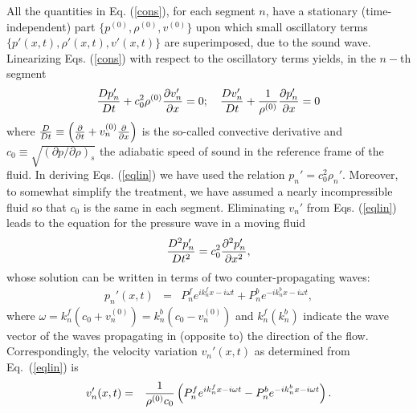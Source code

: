 \documentclass[aps,prl,twocolumn,groupedaddress,amsmath,amssymb]{revtex4}
\begin{document}
All the quantities in Eq. (\ref{cons}), for each segment $n$, have a stationary (time-independent) part $\{p^{(0)},\rho^{(0)}, v^{(0)}\}$ upon which
small oscillatory terms $\{p'(x,t),\rho'(x,t), v'(x,t)\}$ are superimposed, due to the sound wave. Linearizing Eqs. (\ref{cons}) with respect to the
oscillatory terms yields, in the $n-$th segment
\begin{equation}
\label{eqlin}
{Dp_n'\over Dt} +c_0^2\rho^{(0)} {\partial v_n'\over \partial x}=0;\quad {Dv_n'\over Dt} +{1\over \rho^{(0)}} {\partial p_n'\over \partial x}=0
\end{equation}
where ${D\over Dt} \equiv \left({\partial \over \partial t} + v_n^{(0)} {\partial \over \partial x}\right)$ is the so-called convective derivative and
$c_0\equiv \sqrt{(\partial p/\partial \rho)_s}$ the adiabatic speed of sound in the reference frame of the fluid. In deriving Eqs. (\ref{eqlin}) we
have used the relation $p_n'=c_0^2\rho_n'$. Moreover, to somewhat simplify the treatment, we have assumed a nearly incompressible fluid
so that $c_0$ is the same in each segment. Eliminating $v_n'$ from Eqs. (\ref{eqlin}) leads to the equation for the pressure wave
in a moving fluid \cite{RH14}
\begin{equation}
\label{eqp}
{D^2p_n'\over Dt^2} = c_0^2 {\partial^2p_n'\over \partial x^2},
\end{equation}
whose solution can be written in terms of two counter-propagating waves:
\begin{eqnarray}
\label{solution1}
p_n'(x,t)&=& P_n^f e^{ik_n^fx-i\omega t} + P_n^b e^{-ik_n^bx-i\omega t},
\end{eqnarray}
where $\omega=k_n^f(c_0+v_n^{(0)})=k_n^b(c_0-v_n^{(0)})$ and $k_n^f (k_n^b)$ indicate the wave vector of the waves propagating in (opposite to)
the direction of the flow.
Correspondingly, the velocity variation $v_n'(x,t)$ as determined from Eq.~(\ref{eqlin}) is
\begin{eqnarray}
\label{solution2}
v_n'(x,t)&=&{1\over \rho^{(0)} c_0} \left(P_n^fe^{ik_n^fx-i\omega t} - P_n^be^{-ik_n^bx-i\omega t}\right).
\end{eqnarray}
\end{document}
